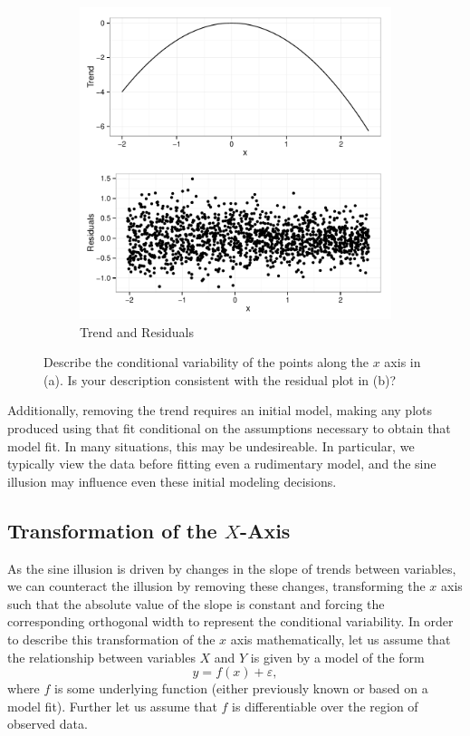 \documentclass[11pt]{isuthesis}\usepackage[]{graphicx}\usepackage[]{color}
\begin{document}
\begin{figure}
\begin{subfigure}[b]{.45\textwidth}
  \includegraphics[width=\textwidth]{fig-cleveland2}
  \caption{\small Trend and Residuals}
  \label{fig:clevelandsubfig2}
\end{subfigure} \hfill
\caption[Changing variability and nonlinear trend lines]{Describe the conditional variability of the points along the $x$ axis in (a). Is your description consistent with the residual plot in (b)?}
\label{fig:cleveland-figure}
\end{figure}

Additionally, removing the trend requires an initial model, making any plots produced using that fit conditional on the assumptions necessary to obtain that model fit. In many situations, this may be undesireable. In particular, we typically view the data before fitting even a rudimentary model, and the sine illusion may influence even these initial modeling decisions.

\subsection{Transformation of the $X$-Axis}
As the sine illusion is driven by changes in the slope of trends between variables, we can counteract the illusion by removing these changes, transforming the $x$ axis such that the absolute value of the slope is constant and forcing the corresponding orthogonal width to represent the conditional variability.
In order to describe this transformation of the $x$ axis mathematically, 
let us assume that the relationship between variables $X$ and $Y$ is given by a  model of the form 
\[
y = f(x) + \varepsilon,
\]
where $f$ is some underlying function (either previously known or based on a model fit). Further let us assume that  $f$ is differentiable over the region of observed data.
\end{document}
